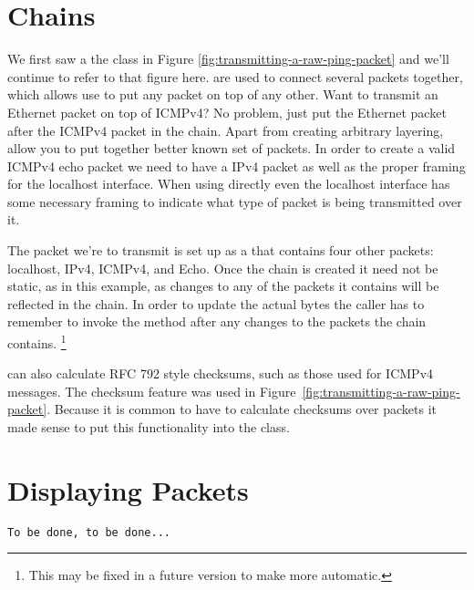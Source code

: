 \documentclass[11pt]{article}
\begin{document}
\section{Chains}
\label{sec:chains}

We first saw a the  class in Figure
\ref{fig:transmitting-a-raw-ping-packet} and we'll continue to refer
to that figure here.   are used to connect several
packets together, which allows use to put any packet on top of any
other.  Want to transmit an Ethernet packet on top of ICMPv4?  No
problem, just put the Ethernet packet after the ICMPv4 packet in the
chain.  Apart from creating arbitrary layering,  allow
you to put together better known set of packets.  In order to create a
valid ICMPv4 echo packet we need to have a IPv4 packet as well as the
proper framing for the localhost interface.  When using 
directly even the localhost interface has some necessary framing to
indicate what type of packet is being transmitted over it.  

The packet we're to transmit is set up as a  that
contains four other packets: localhost, IPv4, ICMPv4, and Echo.  Once
the chain is created it need not be static, as in this example, as
changes to any of the packets it contains will be reflected in the
chain.  In order to update the actual bytes the caller has to remember
to invoke the  method after any changes to the packets
the chain contains.  \footnote{This may be fixed in a future version
  to make  more automatic.}

 can also calculate RFC 792 style checksums, such as
those used for ICMPv4 messages.  The checksum feature was used in
Figure~\ref{fig:transmitting-a-raw-ping-packet}.  Because it is common
to have to calculate checksums over packets it made sense to put this
functionality into the  class.

\section{Displaying Packets}
\label{sec:displaying-packets}

\begin{verbatim}
To be done, to be done...
\end{verbatim}
\end{document}
